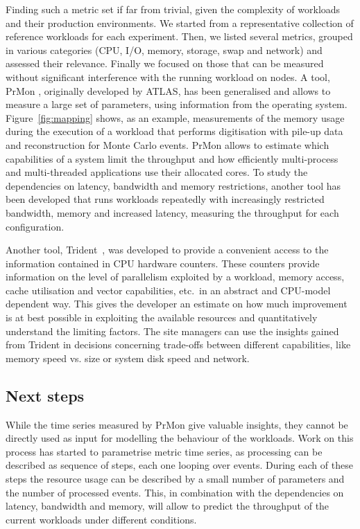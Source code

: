 Finding such a metric set if far from trivial, given the complexity of
workloads and their production environments. We started from a
representative collection of reference workloads for each experiment.
Then, we listed several metrics, grouped in various categories (CPU,
I/O, memory, storage, swap and network) and assessed their
relevance. Finally we focused on those that can be measured without
significant interference with the running workload on nodes. A tool,
PrMon \cite{prmon}, originally developed by ATLAS, has been
generalised and allows to measure a large set of parameters, using
information from the operating system. Figure~\ref{fig:mapping} shows,
as an example, measurements of the memory usage during the execution
of a workload that performs digitisation with pile-up data and
reconstruction for Monte Carlo events.  PrMon allows to estimate which
capabilities of a system limit the throughput and how efficiently
multi-process and multi-threaded applications use their allocated
cores. To study the dependencies on latency, bandwidth and memory
restrictions, another tool has been developed that runs workloads
repeatedly with increasingly restricted bandwidth, memory and
increased latency, measuring the throughput for each configuration.

Another tool, Trident~\cite{trident}, was developed to provide a
convenient access to the information contained in CPU hardware
counters.  These counters provide information on the level of
parallelism exploited by a workload, memory access, cache utilisation
and vector capabilities, etc.~in an abstract and CPU-model dependent
way.  This gives the developer an estimate on how much improvement is
at best possible in exploiting the available resources and
quantitatively understand the limiting factors. The site managers can
use the insights gained from Trident in decisions concerning
trade-offs between different capabilities, like memory speed vs. size
or system disk speed and network.

\subsection{Next steps}
While the time series measured by PrMon give valuable insights, they
cannot be directly used as input for modelling the behaviour of the
workloads. Work on this process has started to parametrise metric time
series, as processing can be described as sequence of steps, each one
looping over events. During each of these steps the resource usage can
be described by a small number of parameters and the number of
processed events. This, in combination with the dependencies on
latency, bandwidth and memory, will allow to predict the throughput of
the current workloads under different conditions.

